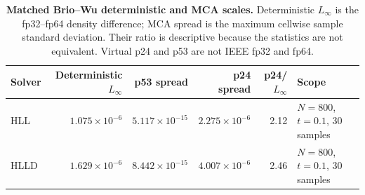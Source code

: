 \begin{table}[htbp]
\centering
\small
\begin{tabularx}{\textwidth}{@{}lrrrrX@{}}
\toprule
Solver & Deterministic $L_\infty$ & p53 spread & p24 spread & p24/$L_\infty$ & Scope \\
\midrule
HLL  & $1.075\times10^{-6}$ & $5.117\times10^{-15}$ & $2.275\times10^{-6}$ & 2.12 & $N=800$, $t=0.1$, 30 samples \\
HLLD & $1.629\times10^{-6}$ & $8.442\times10^{-15}$ & $4.007\times10^{-6}$ & 2.46 & $N=800$, $t=0.1$, 30 samples \\
\bottomrule
\end{tabularx}
\caption[Matched Brio--Wu deterministic and MCA scales]{\textbf{Matched
Brio--Wu deterministic and MCA scales.} Deterministic $L_\infty$ is the
fp32--fp64 density difference; MCA spread is the maximum cellwise sample
standard deviation. Their ratio is descriptive because the statistics are not
equivalent. Virtual p24 and p53 are not IEEE fp32 and fp64.}
\label{tab:ch5-mca-primary}
\end{table}
